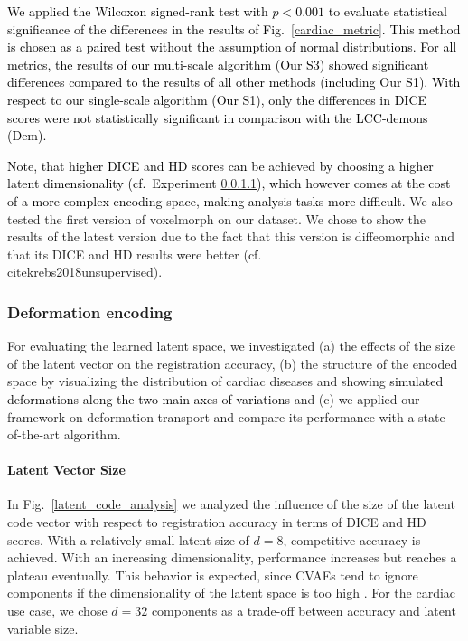 \documentclass[journal]{IEEEtran}
\newcommand{\update}[1]{\textcolor{black}{#1}}
\begin{document}
\update{We applied the Wilcoxon signed-rank test with $p<0.001$ to evaluate statistical significance of the differences in the results of Fig.~\ref{cardiac_metric}. This method is chosen as a paired test without the assumption of normal distributions. For all metrics, the results of our multi-scale algorithm (Our S3) showed significant differences compared to the results of all other methods (including Our S1). With respect to our single-scale algorithm (Our S1), only the differences in DICE scores were not statistically significant in comparison with the LCC-demons (Dem).} 

\update{Note, that higher DICE and HD scores can be achieved by choosing a higher latent dimensionality (cf.\ Experiment \ref{lat_size}), which however comes at the cost of a more complex encoding space, making analysis tasks more difficult.} We also tested the first version of voxelmorph \cite{balakrishnan2018unsupervised} on our dataset. We chose to show the results of the latest version \cite{dalca2018unsupervised} due to the fact that this version is diffeomorphic and that its DICE and HD results were better (cf.\\cite{krebs2018unsupervised}).

\subsubsection{Deformation encoding}
For evaluating the learned latent space, we investigated (a) the effects of the size of the latent vector on the registration accuracy, (b) the structure of the encoded space by visualizing the distribution of cardiac diseases and showing \update{simulated deformations along the two main axes of variations} and (c) we applied our framework on deformation transport and compare its performance with a state-of-the-art algorithm. 

\paragraph{Latent Vector Size}\label{lat_size} In Fig.~\ref{latent_code_analysis} we analyzed the influence of the size of the latent code vector with respect to registration accuracy in terms of DICE and HD scores. With a relatively small latent size of $d=8$, competitive accuracy is achieved. With an increasing dimensionality, performance increases but reaches a plateau eventually. This behavior is expected, since CVAEs tend to ignore components if the dimensionality of the latent space is too high \cite{kingma2014semi}. For the cardiac use case, we chose $d=32$ components as a trade-off between accuracy and latent variable size.
\end{document}
